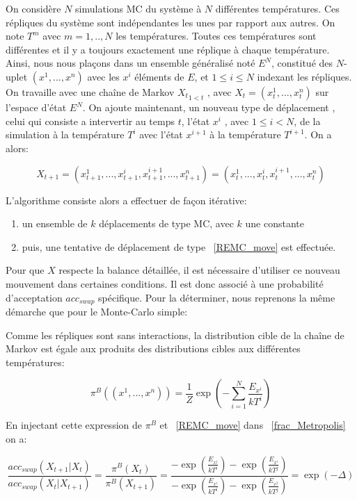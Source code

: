 On considère $N$ simulations MC du système à $N$ différentes températures. Ces répliques du système sont indépendantes les unes par rapport aux autres. On note $T^m$ avec $m=1,..,N$ les températures. Toutes ces températures sont différentes et il y a toujours exactement une réplique à chaque température. Ainsi, nous nous plaçons dans un ensemble généralisé noté $E^N$, constitué des $N$-uplet $(x^1,...,x^n)$ avec les $x^i$ éléments de $E$, et $1 \leq i \leq N$  indexant les répliques. On travaille avec une chaîne de Markov ${X_t}_{1<t}$ , avec $X_t=(x^1_t,...,x^n_t)$ sur l'espace d'état $E^N$. On ajoute maintenant, un nouveau type de déplacement , celui qui consiste a intervertir au temps $t$, l'état $x^i$ , avec $1 \leq i <  N$, de la simulation à la température $T^i$ avec l'état $x^{i+1}$ à la température $T^{i+1}$. On a alors:

\begin{equation}
  \label{REMC_move}
X_{t+1}=(x_{t+1}^1,...,x_{t+1}^i,x_{t+1}^{i+1},...,x_{t+1}^n) = (x_t^1,...,x_t^i,x_t^{i+1},...,x_t^n)
\end{equation}

L'algorithme consiste alors a effectuer de façon itérative:
\begin{enumerate}
\item un ensemble de $k$ déplacements de type MC, avec $k$ une constante  

\item puis, une tentative de déplacement de type ~\ref{REMC_move}  est effectuée.
\end{enumerate}

Pour que $X$ respecte la balance détaillée, il est nécessaire d'utiliser ce nouveau mouvement dans certaines conditions. Il est donc associé à une probabilité d'acceptation $acc_{swap}$ spécifique. Pour la déterminer, nous reprenons la même démarche que pour le Monte-Carlo simple:

Comme les répliques sont sans interactions, la distribution cible de la chaîne de Markov est égale aux produits des distributions cibles aux différentes températures:

\begin{equation}
\pi^B((x^1,...,x^n))=\frac{1}{Z} \exp(-\sum_{i=1}^N \frac{E_{x^i}}{kT^i})
\end{equation}


En injectant cette expression de $\pi^B$ et ~\ref{REMC_move} dans ~\ref{frac_Metropolis} on a:



\begin{equation}
\frac{acc_{swap}(X_{t+1}|X_t)}{acc_{swap}(X_t|X_{t+1})} =\frac{\pi^B(X_t)}{\pi^B(X_{t+1})}  = \frac{ -\exp(\frac{E_{x^j}}{kT^i}) -\exp(\frac{E_{x^i}}{kT^j})}{-\exp(\frac{E_{x^i}}{kT^i}) -\exp(\frac{E_{x^j}}{kT^j})} = \exp(-\Delta) 
\end{equation}



